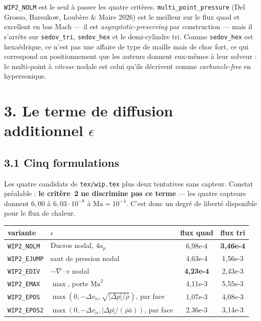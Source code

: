 \documentclass[11pt,a4paper]{article}
\begin{document}
\texttt{WIP2\_NOLM} est le seul à passer les quatre critères. \texttt{multi\_point\_pressure}
(Del Grosso, Barsukow, Loubère \& Maire 2026) est le meilleur sur le flux quad et
excellent en bas Mach --- il est \emph{asymptotic-preserving} par construction --- mais
il s'arrête sur \texttt{sedov\_tri}, \texttt{sedov\_hex} et le demi-cylindre tri.
Comme \texttt{sedov\_hex} est hexaédrique, ce n'est pas une affaire de type de maille
mais de choc fort, ce qui correspond au positionnement que les auteurs donnent
eux-mêmes à leur solveur : le multi-point à \emph{vitesse} nodale est celui qu'ils
décrivent comme \emph{carbuncle-free} en hypersonique.

\section*{3. Le terme de diffusion additionnel $\epsilon$}

\subsection*{3.1 Cinq formulations}

Les quatre candidats de \texttt{tex/wip.tex} plus deux tentatives sans capteur.
Constat préalable : \textbf{le critère~2 ne discrimine pas ce terme} --- les quatre
capteurs donnent $6{,}00$ à $6{,}03\cdot10^{-8}$ à $\mathrm{Ma}=10^{-4}$. C'est donc
un degré de liberté disponible pour le flux de chaleur.

\begin{table}[h]\centering
\begin{tabular}{llcc}
\toprule
variante & $\epsilon$ & flux quad & flux tri \\
\midrule
\texttt{WIP2\_NOLM} & Ducros nodal, $4a_p$ & 6{,}98e-4 & \textbf{3{,}46e-4} \\
\texttt{WIP2\_EJUMP}& saut de pression nodal & 4{,}63e-4 & 1{,}56e-3 \\
\texttt{WIP2\_EDIV} & $-\nabla\!\cdot\!v$ nodal & \textbf{4{,}23e-4} & 2{,}43e-3 \\
\texttt{WIP2\_EMAX} & $\max$, porte $\mathrm{Ma}^2$ & 4{,}11e-3 & 5{,}55e-3 \\
\texttt{WIP2\_EPOS} & $\max(0,-\Delta v_n,\sqrt{|\Delta p|/\bar\rho})$, par face & 1{,}07e-3 & 4{,}08e-3 \\
\texttt{WIP2\_EPOS2}& $\max(0,-\Delta v_n,|\Delta p|/(\bar\rho\bar a))$, par face & 2{,}36e-3 & 3{,}14e-3 \\
\bottomrule
\end{tabular}
\end{table}
\end{document}
